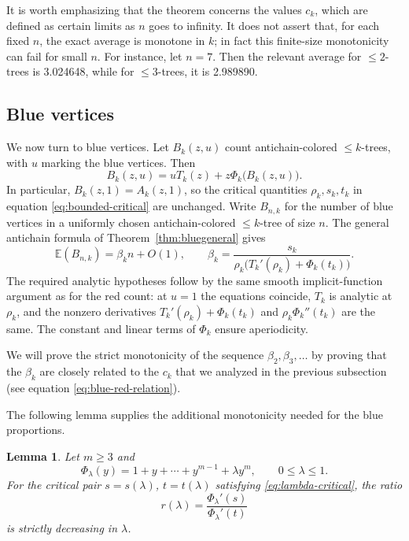 \documentclass[10pt,a4paper]{amsart}
\newtheorem{lemma}[theorem]{Lemma}
\theoremstyle{remark}
\begin{document}
It is worth emphasizing that the theorem concerns the values $c_k$, which are defined as certain
limits as $n$ goes to infinity.   It does not assert that, for each fixed $n$, the exact average is monotone in $k$; in fact this finite-size monotonicity can fail for small $n$. For instance, let $n=7$. 
Then the relevant average for $\leq 2$-trees is 3.024648, while for $\leq 3$-trees, it is 2.989890.

\subsection{Blue vertices}
We now turn to blue vertices. Let $B_k(z,u)$ count antichain-colored
$\leq k$-trees, with $u$ marking the blue vertices. Then
\[
B_k(z,u)=uT_k(z)+z\Phi_k\bigl(B_k(z,u)\bigr).
\]
In particular, $B_k(z,1)=A_k(z,1)$, so the critical quantities
$\rho_k,s_k,t_k$ in equation \eqref{eq:bounded-critical} are unchanged.
Write $B_{n,k}$ for the number of blue vertices in a uniformly chosen
antichain-colored $\leq k$-tree of size $n$. The general antichain formula
of Theorem~\ref{thm:bluegeneral} gives
\begin{equation} \label{blueformula}
\mathbb E(B_{n,k})=\beta_k n+O(1),
\qquad
\beta_k=\frac{s_k}{\rho_k\bigl(T_k'(\rho_k)+\Phi_k(t_k)\bigr)}.
\end{equation}
The required analytic hypotheses follow by the same smooth
implicit-function argument as for the red count: at $u=1$ the equations
coincide, $T_k$ is analytic at $\rho_k$, and the nonzero derivatives
$T_k'(\rho_k)+\Phi_k(t_k)$ and $\rho_k\Phi_k''(t_k)$ are the same.
The constant and linear terms of $\Phi_k$ ensure aperiodicity.

We will prove the strict monotonicity of the sequence $\beta_2, \beta_3,\ldots $ by proving that the
$\beta_k$ are closely related to the $c_k$ that we analyzed in the previous subsection (see equation
\eqref{eq:blue-red-relation}).

The following lemma supplies the additional monotonicity needed for the
blue proportions.

\begin{lemma}\label{lem:blue-ratio}
Let $m\geq3$ and
\[
\Phi_\lambda(y)=1+y+\cdots+y^{m-1}+\lambda y^m,
\qquad 0\leq\lambda\leq1.
\]
For the critical pair $s=s(\lambda)$, $t=t(\lambda)$ satisfying
\eqref{eq:lambda-critical}, the ratio
\[
r(\lambda)=\frac{\Phi_\lambda'(s)}{\Phi_\lambda'(t)}
\]
is strictly decreasing in $\lambda$.
\end{lemma}
\end{document}
